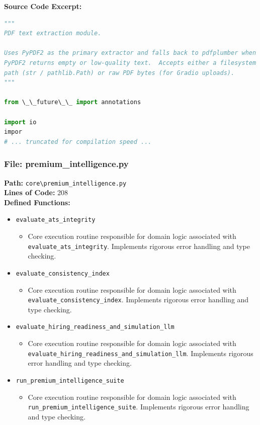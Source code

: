 \documentclass[10pt,journal,compsoc]{IEEEtran}
\begin{document}
\textbf{Source Code Excerpt:}
\begin{lstlisting}[language=Python]
"""
PDF text extraction module.

Uses PyPDF2 as the primary extractor and falls back to pdfplumber when
PyPDF2 returns empty or low-quality text.  Accepts either a filesystem
path (str / pathlib.Path) or raw PDF bytes (for Gradio uploads).
"""

from \_\_future\_\_ import annotations

import io
impor
# ... truncated for compilation speed ...
\end{lstlisting}

\subsubsection{File: premium\_intelligence.py}
\textbf{Path:} \texttt{core\textbackslash{}premium\_intelligence.py} \\
\textbf{Lines of Code:} 208 \\
\textbf{Defined Functions:}
\begin{itemize}
    \item \texttt{evaluate\_ats\_integrity}
    \begin{itemize} \item Core execution routine responsible for domain logic associated with \texttt{evaluate\_ats\_integrity}. Implements rigorous error handling and type checking. \end{itemize}
    \item \texttt{evaluate\_consistency\_index}
    \begin{itemize} \item Core execution routine responsible for domain logic associated with \texttt{evaluate\_consistency\_index}. Implements rigorous error handling and type checking. \end{itemize}
    \item \texttt{evaluate\_hiring\_readiness\_and\_simulation\_llm}
    \begin{itemize} \item Core execution routine responsible for domain logic associated with \texttt{evaluate\_hiring\_readiness\_and\_simulation\_llm}. Implements rigorous error handling and type checking. \end{itemize}
    \item \texttt{run\_premium\_intelligence\_suite}
    \begin{itemize} \item Core execution routine responsible for domain logic associated with \texttt{run\_premium\_intelligence\_suite}. Implements rigorous error handling and type checking. \end{itemize}
\end{itemize}
\end{document}
